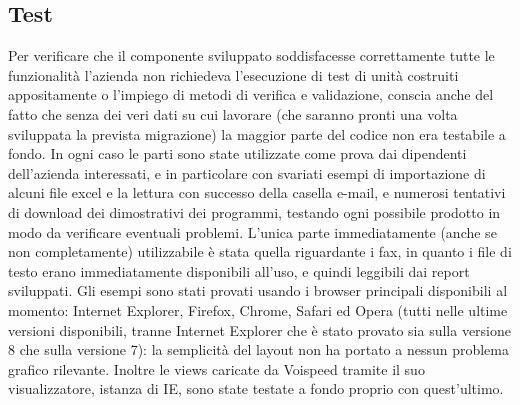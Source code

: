 \newpage
\subsection{Test}
Per verificare che il componente sviluppato soddisfacesse correttamente tutte le funzionalit\`a l'azienda non richiedeva l'esecuzione di test di unit\`a costruiti appositamente o l'impiego di metodi di verifica e validazione, conscia anche del fatto che senza dei veri dati su cui lavorare (che saranno pronti una volta sviluppata la prevista migrazione) la maggior parte del codice non era testabile a fondo. In ogni caso le parti sono state utilizzate come prova dai dipendenti dell'azienda interessati, e in particolare con svariati esempi di importazione di alcuni file excel e la lettura con successo della casella e-mail, e numerosi tentativi di download dei dimostrativi dei programmi, testando ogni possibile prodotto in modo da verificare eventuali problemi. 
L'unica parte immediatamente (anche se non completamente) utilizzabile \`e stata quella riguardante i fax, in quanto i file di testo erano immediatamente disponibili all'uso, e quindi leggibili dai report sviluppati. 
Gli esempi sono stati provati usando i browser principali disponibili al momento: Internet Explorer, Firefox, Chrome, Safari ed Opera (tutti nelle ultime versioni disponibili, tranne Internet Explorer che \`e stato provato sia sulla versione 8 che sulla versione 7): la semplicit\`a del layout non ha portato a nessun problema grafico rilevante. Inoltre le views caricate da Voispeed tramite il suo visualizzatore, istanza di IE, sono state testate a fondo proprio con quest'ultimo.

